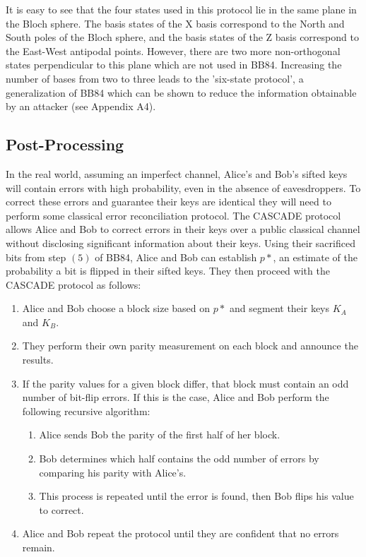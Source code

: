 \documentclass[conference]{IEEEtran}
\begin{document}
It is easy to see that the four states used in this protocol lie in the same plane in the Bloch sphere. The basis states of the X basis correspond to the North and South poles of the Bloch sphere, and the basis states of the Z basis correspond to the East-West antipodal points\cite{Williams}. However, there are two more non-orthogonal states perpendicular to this plane which are not used in BB84. Increasing the number of bases from two to three leads to the 'six-state protocol', a generalization of BB84 which can be shown to reduce the information obtainable by an attacker (see Appendix A4).\\

\subsection{Post-Processing}
In the real world, assuming an imperfect channel, Alice's and Bob's sifted keys will contain errors with high probability, even in the absence of eavesdroppers. To correct these errors and guarantee their keys are identical they will need to perform some classical error reconciliation protocol. The CASCADE protocol\cite{Salvail} allows Alice and Bob to correct errors in their keys over a public classical channel without disclosing significant information about their keys. Using their sacrificed bits from step $(5)$ of BB84, Alice and Bob can establish $p*$, an estimate of the probability a bit is flipped in their sifted keys. They then proceed with the CASCADE protocol as follows\cite{Williams}:
\begin{enumerate}
\item Alice and Bob choose a block size based on $p*$ and segment their keys $K_A$ and $K_B$.
\item They perform their own parity measurement on each block and announce the results.
\item If the parity values for a given block differ, that block must contain an odd number of bit-flip errors. If this is the case, Alice and Bob perform the following recursive algorithm\cite{Salvail}:
  \begin{enumerate}
  \item Alice sends Bob the parity of the first half of her block.
  \item Bob determines which half contains the odd number of errors by comparing his parity with Alice's.
  \item This process is repeated until the error is found, then Bob flips his value to correct.
  \end{enumerate}
\item Alice and Bob repeat the protocol until they are confident that no errors remain.
\end{enumerate}
\end{document}
